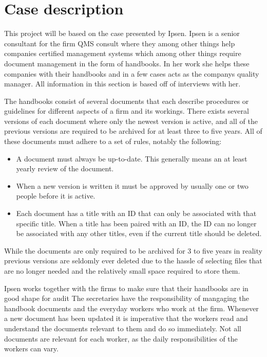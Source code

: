 \section{Case description} \label{sec:CaseDescription}

This project will be based on the case presented by Ipsen. 
Ipsen is a senior consultant for the firm QMS consult where they among other things help companies certified management systems which among other things require document management in the form of handbooks.
In her work she helps these companies with their handbooks and in a few cases acts as the companys quality manager.
All information in this section is based off of interviews with her.

The handbooks consist of several documents that each describe procedures or guidelines for different aspects of a firm and its workings.
There exists several versions of each document where only the newest version is active, and all of the previous versions are required to be archived for at least three to five years. All of these documents must adhere to a set of rules, notably the following:

\begin{itemize}
\item A document must always be up-to-date.
This generally means an at least yearly review of the document.
\item When a new version is written it must be approved by usually one or two people before it is active.
\item Each document has a title with an ID that can only be associated with that specific title. 
When a title has been paired with an ID, the ID can no longer be associated with any other titles, even if the current title should be deleted.
\end{itemize}

While the documents are only required to be archived for 3 to five years in reality previous versions are seldomly ever deleted due to the hassle of selecting files that are no longer needed and the relatively small space required to store them.

Ipsen works together with the firms to make sure that their handbooks are in good shape for audit
The secretaries have the responsibility of mangaging the handbook documents and the everyday workers who work at the firm.
Whenever a new document has been updated it is imperative that the workers read and understand the documents relevant to them and do so immediately.
Not all documents are relevant for each worker, as the daily responsibilities of the workers can vary.


